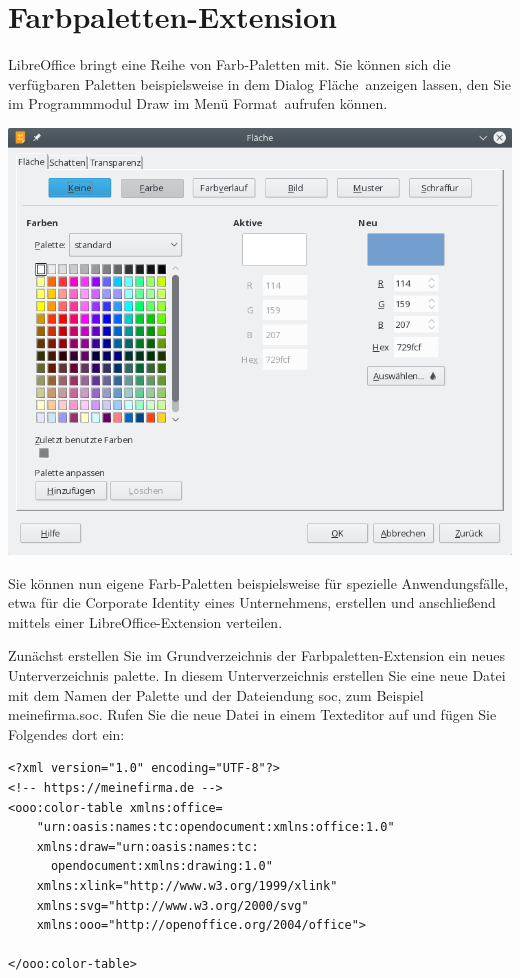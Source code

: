 \documentclass[a4paper,10pt,pagesize,titlepage]{scrbook}
\begin{document}
\section{Farbpaletten-Extension}

LibreOffice bringt eine Reihe von Farb-Paletten mit. Sie können sich die verfügbaren Paletten beispielsweise in dem Dialog \glqq Fläche\grqq~anzeigen lassen, den Sie im Programmmodul Draw im Menü \glqq Format\grqq~aufrufen können.

\begin{center}
	\includegraphics[width=0.9\linewidth]{pics/dialog_flaeche}
	\label{fig:dialog_flaeche}
\end{center}

Sie können nun eigene Farb-Paletten beispielsweise für spezielle Anwendungsfälle, etwa für die Corporate Identity eines Unternehmens, erstellen und anschließend mittels einer LibreOffice-Extension verteilen.

Zunächst erstellen Sie im Grundverzeichnis der Farbpaletten-Extension ein neues Unterverzeichnis \glqq palette\grqq. In diesem Unterverzeichnis erstellen Sie eine neue Datei mit dem Namen der Palette und der Dateiendung \glqq soc\grqq, zum Beispiel \glqq meinefirma.soc\grqq. Rufen Sie die neue Datei in einem Texteditor auf und fügen Sie Folgendes dort ein:

\begin{lstlisting}
<?xml version="1.0" encoding="UTF-8"?>
<!-- https://meinefirma.de -->
<ooo:color-table xmlns:office=
    "urn:oasis:names:tc:opendocument:xmlns:office:1.0"
    xmlns:draw="urn:oasis:names:tc:
      opendocument:xmlns:drawing:1.0"
    xmlns:xlink="http://www.w3.org/1999/xlink"
    xmlns:svg="http://www.w3.org/2000/svg"
    xmlns:ooo="http://openoffice.org/2004/office">
    
</ooo:color-table>
\end{lstlisting}
\end{document}
